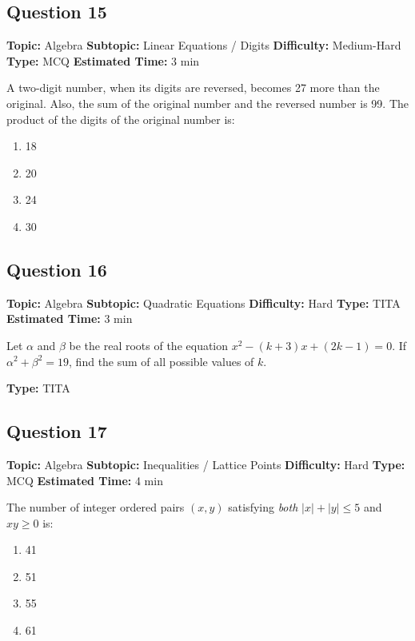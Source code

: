\documentclass[11pt]{article}
\begin{document}
\subsection*{Question 15}
\textbf{Topic:} Algebra \quad \textbf{Subtopic:} Linear Equations / Digits \quad \textbf{Difficulty:} Medium-Hard \quad \textbf{Type:} MCQ \quad \textbf{Estimated Time:} 3 min

\begin{tcolorbox}
A two-digit number, when its digits are reversed, becomes 27 more than the original. Also, the sum of the original number and the reversed number is 99. The product of the digits of the original number is:
\end{tcolorbox}
\begin{enumerate}[label=(\Alph*)]
\item 18
\item 20
\item 24
\item 30
\end{enumerate}

\subsection*{Question 16}
\textbf{Topic:} Algebra \quad \textbf{Subtopic:} Quadratic Equations \quad \textbf{Difficulty:} Hard \quad \textbf{Type:} TITA \quad \textbf{Estimated Time:} 3 min

\begin{tcolorbox}
Let $\alpha$ and $\beta$ be the real roots of the equation $x^2 - (k+3)x + (2k-1) = 0$. If $\alpha^2 + \beta^2 = 19$, find the sum of all possible values of $k$.
\end{tcolorbox}
\textbf{Type:} TITA

\subsection*{Question 17}
\textbf{Topic:} Algebra \quad \textbf{Subtopic:} Inequalities / Lattice Points \quad \textbf{Difficulty:} Hard \quad \textbf{Type:} MCQ \quad \textbf{Estimated Time:} 4 min

\begin{tcolorbox}
The number of integer ordered pairs $(x, y)$ satisfying \emph{both} $|x| + |y| \le 5$ and $xy \ge 0$ is:
\end{tcolorbox}
\begin{enumerate}[label=(\Alph*)]
\item 41
\item 51
\item 55
\item 61
\end{enumerate}
\end{document}
